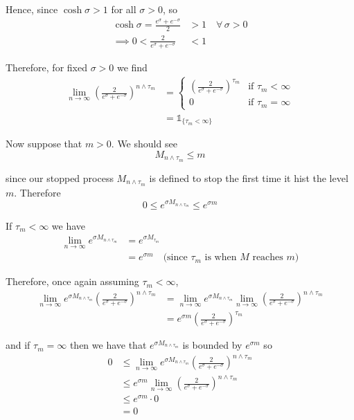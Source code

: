 \documentclass[12pt]{article}
\begin{document}
Hence, since $\cosh \sigma > 1$ for all $\sigma > 0$, so
\begin{align*}
	\cosh \sigma = \frac{ e^\sigma + e^{-\sigma} }{2} &> 1 \quad \forall\,\sigma > 0 \\
	\implies 0 < \frac{2}{e^\sigma + e^{-\sigma} } &< 1 
\end{align*}

Therefore, for fixed $\sigma > 0$ we find
\begin{align*}
	\lim_{n\to\infty} \left( \frac{2}{e^\sigma + e^{-\sigma} } \right)^{n\land\tau_m} &= 
	\begin{cases}
		\left( \frac{2}{e^\sigma + e^{-\sigma} } \right)^{\tau_m} & \text{if } \tau_m < \infty \\
		0 & \text{if } \tau_m = \infty
	\end{cases} \\
	&= \mathds 1_{\{\tau_m < \infty\}}
\end{align*}

Now suppose that $m > 0$. We should see
\begin{equation*}
	M_{n\land\tau_m} \leq m
\end{equation*}

since our stopped process $M_{n\land\tau_m}$ is defined to stop the first time it hist the level $m$. Therefore
\begin{equation*}
	0 \leq e^{\sigma M_{n\land\tau_m}} \leq e^{\sigma m}
\end{equation*}

If $\tau_m < \infty$ we have
\begin{align*}
	\lim_{n\to\infty} e^{\sigma M_{n\land\tau_m}} &= e^{\sigma M_{\tau_m}} \\
	&= e^{\sigma m} \quad \text{(since $\tau_m$ is when $M$ reaches $m$)}
\end{align*}

Therefore, once again assuming $\tau_m < \infty$,
\begin{align*}
	\lim_{n\to\infty} e^{\sigma M_{n\land\tau_m}} \left( \frac{2}{e^\sigma + e^{-\sigma} } \right)^{n\land\tau_m} &= \lim_{n\to\infty} e^{\sigma M_{n\land\tau_m}} \lim_{n\to\infty} \left( \frac{2}{e^\sigma + e^{-\sigma} } \right)^{n\land\tau_m} \\
	&= e^{\sigma m} \left( \frac{2}{e^\sigma + e^{-\sigma} } \right)^{\tau_m}
\end{align*}

and if $\tau_m = \infty$ then we have that $e^{\sigma M_{n\land\tau_m}}$ is bounded by $e^{\sigma m}$ so
\begin{align*}
	0 &\leq \lim_{n\to\infty} e^{\sigma M_{n\land\tau_m}} \left( \frac{2}{e^\sigma + e^{-\sigma} } \right)^{n\land\tau_m} \\
	&\leq e^{\sigma m} \lim_{n\to\infty} \left( \frac{2}{e^\sigma + e^{-\sigma} } \right)^{n\land\tau_m} \\
	&\leq e^{\sigma m} \cdot 0 \\
	&= 0
\end{align*}
\end{document}
